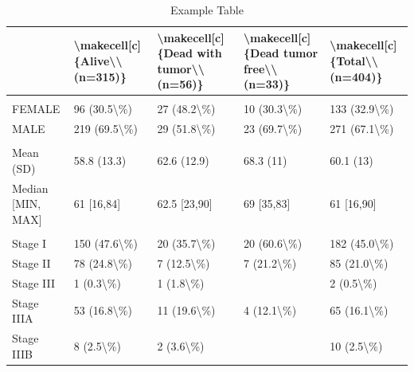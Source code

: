 \documentclass[
]{article}
\begin{document}
\begin{longtable}[t]{lllll}
\caption{\label{tab:unnamed-chunk-1}Example Table}\\
\toprule
 & \textbackslash{}makecell[c]\{Alive\textbackslash{}\textbackslash{}(n=315)\} & \textbackslash{}makecell[c]\{Dead with tumor\textbackslash{}\textbackslash{}(n=56)\} & \textbackslash{}makecell[c]\{Dead tumor free\textbackslash{}\textbackslash{}(n=33)\} & \textbackslash{}makecell[c]\{Total\textbackslash{}\textbackslash{}(n=404)\}\\
\midrule
\addlinespace[0.3em]
\multicolumn{5}{l}{\textbf{Gender*}}\\
\hspace{1em}FEMALE & 96 (30.5\textbackslash{}\%) & 27 (48.2\textbackslash{}\%) & 10 (30.3\textbackslash{}\%) & 133 (32.9\textbackslash{}\%)\\
\hspace{1em}MALE & 219 (69.5\textbackslash{}\%) & 29 (51.8\textbackslash{}\%) & 23 (69.7\textbackslash{}\%) & 271 (67.1\textbackslash{}\%)\\
\addlinespace[0.3em]
\multicolumn{5}{l}{\textbf{Age}}\\
\hspace{1em}Mean (SD) & 58.8 (13.3) & 62.6 (12.9) & 68.3 (11) & 60.1 (13)\\
\hspace{1em}Median [MIN, MAX] & 61 [16,84] & 62.5 [23,90] & 69 [35,83] & 61 [16,90]\\
\addlinespace[0.3em]
\multicolumn{5}{l}{\textbf{Stage}}\\
\hspace{1em}Stage I & 150 (47.6\textbackslash{}\%) & 20 (35.7\textbackslash{}\%) & 20 (60.6\textbackslash{}\%) & 182 (45.0\textbackslash{}\%)\\
\hspace{1em}Stage II & 78 (24.8\textbackslash{}\%) & 7 (12.5\textbackslash{}\%) & 7 (21.2\textbackslash{}\%) & 85 (21.0\textbackslash{}\%)\\
\hspace{1em}Stage III & 1 (0.3\textbackslash{}\%) & 1 (1.8\textbackslash{}\%) &  & 2 (0.5\textbackslash{}\%)\\
\hspace{1em}Stage IIIA & 53 (16.8\textbackslash{}\%) & 11 (19.6\textbackslash{}\%) & 4 (12.1\textbackslash{}\%) & 65 (16.1\textbackslash{}\%)\\
\hspace{1em}Stage IIIB & 8 (2.5\textbackslash{}\%) & 2 (3.6\textbackslash{}\%) &  & 10 (2.5\textbackslash{}\%)\\

\end{longtable}
\end{document}
